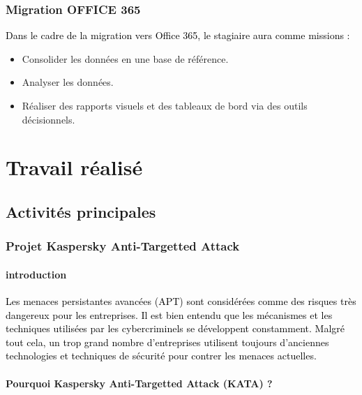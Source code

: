 \documentclass[a4paper,12pt]{report}
\begin{document}
\subsection{Migration OFFICE 365}
\textcolor{black}{Dans le cadre de la migration vers Office 365, le stagiaire aura comme missions :}
\begin{itemize}
	\item Consolider les données en une base de référence.
	\item Analyser les données.
	\item Réaliser des rapports visuels et des tableaux de bord via des outils décisionnels.
\end{itemize}

\chapter{Travail réalisé }
\vspace{-1cm}
\section{Activités principales}
\subsection{Projet Kaspersky Anti-Targetted Attack}

\subsubsection*{\textbf{introduction}}

\textcolor{black}{Les menaces persistantes avancées (APT) sont considérées comme des risques très dangereux pour les entreprises.}
\textcolor{black}{Il est bien entendu que les mécanismes et les techniques utilisées par les cybercriminels se développent constamment. Malgré tout cela, un trop grand nombre d'entreprises utilisent toujours d'anciennes technologies et techniques de sécurité pour contrer les menaces actuelles.}

\subsubsection*{\textbf{Pourquoi Kaspersky Anti-Targetted Attack (KATA) ?} }
\end{document}
